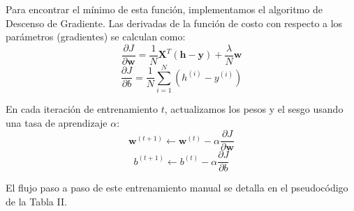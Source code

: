 \documentclass[twocolumn,10pt,journal]{IEEEtran}
\begin{document}
Para encontrar el mínimo de esta función, implementamos el algoritmo de Descenso de Gradiente. Las derivadas de la función de costo con respecto a los parámetros (gradientes) se calculan como:
\begin{equation}
\frac{\partial J}{\partial \mathbf{w}} = \frac{1}{N} \mathbf{X}^T (\mathbf{h} - \mathbf{y}) + \frac{\lambda}{N} \mathbf{w}
\end{equation}
\begin{equation}
\frac{\partial J}{\partial b} = \frac{1}{N} \sum_{i=1}^N (h^{(i)} - y^{(i)})
\end{equation}

En cada iteración de entrenamiento $t$, actualizamos los pesos y el sesgo usando una tasa de aprendizaje $\alpha$:
\begin{equation}
\mathbf{w}^{(t+1)} \leftarrow \mathbf{w}^{(t)} - \alpha \frac{\partial J}{\partial \mathbf{w}}
\end{equation}
\begin{equation}
b^{(t+1)} \leftarrow b^{(t)} - \alpha \frac{\partial J}{\partial b}
\end{equation}

El flujo paso a paso de este entrenamiento manual se detalla en el pseudocódigo de la Tabla II.
\end{document}
